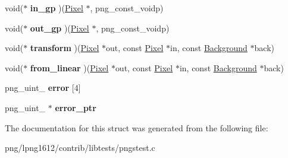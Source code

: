 \begin{DoxyCompactItemize}
\item 
\hypertarget{struct_transform_a75f1c905d977a3003df4351ebf4a28fa}{void($\ast$ {\bfseries in\+\_\+gp} )(\hyperlink{class_pixel}{Pixel} $\ast$, png\+\_\+const\+\_\+voidp)}\label{struct_transform_a75f1c905d977a3003df4351ebf4a28fa}

\item 
\hypertarget{struct_transform_aeb6453fa5f2310fc1fd543158c776423}{void($\ast$ {\bfseries out\+\_\+gp} )(\hyperlink{class_pixel}{Pixel} $\ast$, png\+\_\+const\+\_\+voidp)}\label{struct_transform_aeb6453fa5f2310fc1fd543158c776423}

\item 
\hypertarget{struct_transform_aefcc2a689ae33f3b307799634ca25968}{void($\ast$ {\bfseries transform} )(\hyperlink{class_pixel}{Pixel} $\ast$out, const \hyperlink{class_pixel}{Pixel} $\ast$in, const \hyperlink{struct_background}{Background} $\ast$back)}\label{struct_transform_aefcc2a689ae33f3b307799634ca25968}

\item 
\hypertarget{struct_transform_abb268a850dc522e85072ec7a12c1c2a1}{void($\ast$ {\bfseries from\+\_\+linear} )(\hyperlink{class_pixel}{Pixel} $\ast$out, const \hyperlink{class_pixel}{Pixel} $\ast$in, const \hyperlink{struct_background}{Background} $\ast$back)}\label{struct_transform_abb268a850dc522e85072ec7a12c1c2a1}

\item 
\hypertarget{struct_transform_abe85fe7d2eed659d8ffec1bc5eeb8b43}{png\+\_\+uint\+\_ {\bfseries error} \mbox{[}4\mbox{]}}\label{struct_transform_abe85fe7d2eed659d8ffec1bc5eeb8b43}

\item 
\hypertarget{struct_transform_a52b9562b18ae618e25185f2227c2725a}{png\+\_\+uint\+\_ $\ast$ {\bfseries error\+\_\+ptr}}\label{struct_transform_a52b9562b18ae618e25185f2227c2725a}

\end{DoxyCompactItemize}


The documentation for this struct was generated from the following file\+:\begin{DoxyCompactItemize}
\item 
png/lpng1612/contrib/libtests/pngstest.\+c\end{DoxyCompactItemize}
